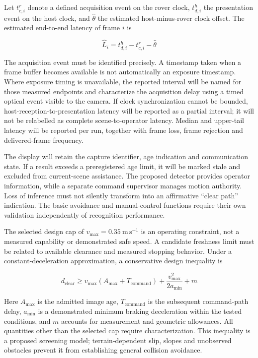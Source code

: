 \documentclass[11pt,letterpaper]{article}
\begin{document}
Let \(t_{c,i}^{r}\) denote a defined acquisition event on the rover clock, \(t_{d,i}^{h}\) the presentation event on the host clock, and \(\hat\theta\) the estimated host-minus-rover clock offset. The estimated end-to-end latency of frame \(i\) is

\begin{equation}
\hat L_i=t_{d,i}^{h}-t_{c,i}^{r}-\hat\theta
\label{eq:26}
\end{equation}

The acquisition event must be identified precisely. A timestamp taken when a frame buffer becomes available is not automatically an exposure timestamp. Where exposure timing is unavailable, the reported interval will be named for those measured endpoints and characterize the acquisition delay using a timed optical event visible to the camera. If clock synchronization cannot be bounded, host-reception-to-presentation latency will be reported as a partial interval; it will not be relabelled as complete scene-to-operator latency. Median and upper-tail latency will be reported per run, together with frame loss, frame rejection and delivered-frame frequency.

The display will retain the capture identifier, age indication and communication state. If a result exceeds a preregistered age limit, it will be marked stale and excluded from current-scene assistance. The proposed detector provides operator information, while a separate command supervisor manages motion authority. Loss of inference must not silently transform into an affirmative ``clear path'' indication. The basic avoidance and manual-control functions require their own validation independently of recognition performance.

The selected design cap of \(v_{\max}=0.35\ \mathrm{m\,s^{-1}}\) is an operating constraint, not a measured capability or demonstrated safe speed. A candidate freshness limit must be related to available clearance and measured stopping behavior. Under a constant-deceleration approximation, a conservative design inequality is

\begin{equation}
d_{\mathrm{clear}}\geq v_{\max}(A_{\max}+T_{\mathrm{command}})
+\frac{v_{\max}^{2}}{2a_{\min}}+m
\label{eq:27}
\end{equation}

Here \(A_{\max}\) is the admitted image age, \(T_{\mathrm{command}}\) is the subsequent command-path delay, \(a_{\min}\) is a demonstrated minimum braking deceleration within the tested conditions, and \(m\) accounts for measurement and geometric allowances. All quantities other than the selected cap require characterization. This inequality is a proposed screening model; terrain-dependent slip, slopes and unobserved obstacles prevent it from establishing general collision avoidance.
\end{document}
